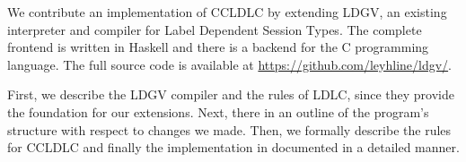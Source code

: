 We contribute an implementation of CCLDLC by extending LDGV, an existing interpreter and compiler for Label Dependent Session Types. The complete frontend is written in Haskell and there is a backend for the C programming language. The full source code is available at \url{https://github.com/leyhline/ldgv/}. 

First, we describe the LDGV compiler and the rules of LDLC, since they provide the foundation for our extensions. Next, there in an outline of the program's structure with respect to changes we made. Then, we formally describe the rules for CCLDLC and finally the implementation in documented in a detailed manner.

